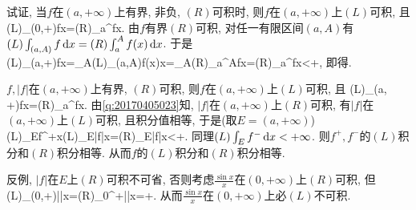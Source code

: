 试证, 当$f$在$(a,+\infty)$上有界, 非负, $(R)$可积时, 则$f$在$(a, +\infty)$上$(L)$可积, 且
\bee
(L)\int_{(0,+\infty)}f\ud x=(R)\int_a^{\infty}f\ud x.
\eee
\eq
\ba
由$f$有界$(R)$可积, 对任一有限区间$(a, A)$有$(L)\int_{(a,A)}f\,\mathrm{d} x=(R)\int_a^Af(x)\,\mathrm{d} x$. 于是
\bee
(L)\int_{(a,+\infty)}f\ud x=\lim_{A\to\infty}(L)\int_{(a,A)}f(x)\ud x=\lim_{A\to\infty}(R)\int_a^Af\ud x=(R)\int_a^{\infty}f\ud x<+\infty,
\eee
即得.
\ea

\bq{}{}
$f, |f|$在$(a,+\infty)$上有界, $(R)$可积, 则$f$在$(a, +\infty)$上$(L)$可积, 且
\bee
(L)\int_{(a, +\infty)}f\ud x=(R)\int_a^{\infty}f\ud x.
\eee
\eq
\ba
由\ref{q:20170405023}知, $|f|$在$(a, +\infty)$上$(R)$可积, 有$|f|$在$(a, +\infty)$上$(L)$可积, 且积分值相等, 于是(取$E=(a,+\infty)$)
\bee
(L)\int_Ef^+\ud x\le (L)\int_E|f|\ud x=(R)\int_E|f|\ud x<+\infty.
\eee
同理$(L)\int_Ef^-\,\mathrm{d} x<+\infty$. 则$f^+, f^-$的$(L)$积分和$(R)$积分相等. 从而$f$的$(L)$积分和$(R)$积分相等.

反例, $|f|$在$E$上$(R)$可积不可省, 否则考虑$\frac{\sin x}{x}$在$(0,+\infty)$上$(R)$可积, 但
\bee
(L)\int_{(0,+\infty)}\left|\right|\ud x=(R)\int_0^{+\infty}\left|\right|\ud x=+\infty.
\eee
从而$\frac{\sin x}{x}$在$(0,+\infty)$上必$(L)$不可积.
\ea
